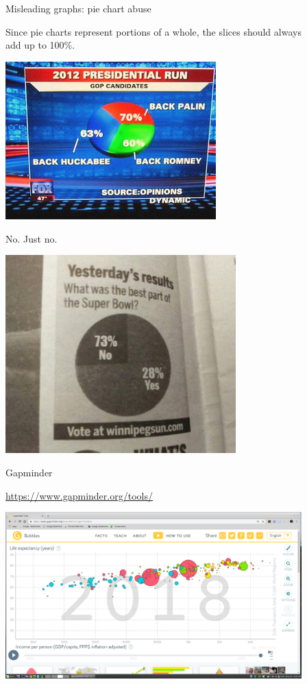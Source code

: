 \documentclass[]{beamer}
\begin{document}
\begin{frame}{Misleading graphs: pie chart abuse}
\begin{block}{}
Since pie charts represent portions of a whole, the slices should always\\ add up to 100\%.
\end{block}
\pause
\begin{center}
\includegraphics[width=3.2in]{../images/ch02_bad_piechart}
\end{center}

\end{frame}

\begin{frame}{No. Just no.}
\begin{center}
\includegraphics[width=3.5in]{../images/ch02_sb_piechart}
\end{center}
\end{frame}

\begin{frame}{Gapminder}

\url{https://www.gapminder.org/tools/}

\begin{center}
\includegraphics[width=4.5in]{../images/ch02_gapminder}
\end{center}


\end{frame}
\end{document}
